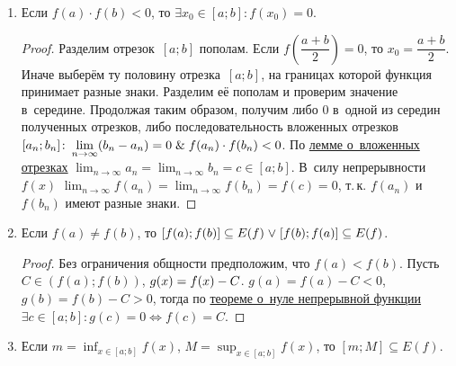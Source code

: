 \begin{enumerate}
	\item \begin{theorem}
	\label{th:zero_of_continuous_function}
	Если $f(a) \cdot f(b) < 0$, то $\exists x_0 \in [a; b] \colon f(x_0) = 0$.
	\end{theorem}
	\begin{proof}
	Разделим отрезок~$[a; b]$ пополам.
	Если $f\left( \dfrac{a + b}2 \right) = 0$, то $x_0 = \dfrac{a + b}2$.
	Иначе выберём ту половину отрезка~$[a; b]$, на границах которой функция принимает разные знаки.
	Разделим её пополам и проверим значение в~середине.
	Продолжая таким образом, получим либо $0$ в~одной из середин полученных отрезков, либо последовательность вложенных отрезков~$\displaystyle [a_n; b_n] \colon \lim_{n \to \infty} (b_n - a_n) = 0 \mathrel{\&} f(a_n) \cdot f(b_n) < 0$.
	По \hyperref[lemma:about_nested_intervals]{лемме о~вложенных отрезках} $\displaystyle \lim_{n \to \infty} a_n = \lim_{n \to \infty} b_n = c \in [a; b]$.
	В~силу непрерывности~$f(x)$ $\displaystyle \lim_{n \to \infty} f(a_n) = \lim_{n \to \infty} f(b_n) = f(c) = 0$, т.\,к. $f(a_n)$ и $f(b_n)$ имеют разные знаки.
	\end{proof}
	
	\item \begin{theorem}
	\label{th:intermediate_value}
	Если $f(a) \neq f(b)$, то $[f(a); f(b)] \opbr\subseteq E(f) \opbr\lOr [f(b); f(a)] \opbr\subseteq E(f)$.
	\end{theorem}
	\begin{proof}
	Без ограничения общности предположим, что $f(a) < f(b)$.
	Пусть $C \in (f(a); f(b))$, $g(x) \opbr= f(x) - C$.
	$g(a) = f(a) - C < 0$, $g(b) = f(b) - C > 0$, тогда по \hyperref[th:zero_of_continuous_function]{теореме о~нуле непрерывной функции} $\exists c \in [a; b] \colon \allowbreak g(c) = 0 \Leftrightarrow f(c) = C$.
	\end{proof}
	
	\item Если $\displaystyle m = \inf_{x \in [a; b]} f(x)$, $\displaystyle M = \sup_{x \in [a; b]} f(x)$, то $[m; M] \subseteq E(f)$.
\end{enumerate}